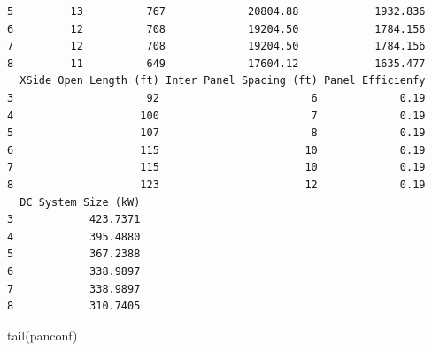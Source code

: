 \documentclass[
  letterpaper,
  DIV=11,
  numbers=noendperiod]{scrartcl}
\newenvironment{Shaded}{\begin{snugshade}}{\end{snugshade}}
\newcommand{\FunctionTok}[1]{\textcolor[rgb]{0.28,0.35,0.67}{#1}}
\newcommand{\NormalTok}[1]{\textcolor[rgb]{0.00,0.23,0.31}{#1}}
\begin{document}
\begin{verbatim}
5         13          767             20804.88            1932.836
6         12          708             19204.50            1784.156
7         12          708             19204.50            1784.156
8         11          649             17604.12            1635.477
  XSide Open Length (ft) Inter Panel Spacing (ft) Panel Efficienfy
3                     92                        6             0.19
4                    100                        7             0.19
5                    107                        8             0.19
6                    115                       10             0.19
7                    115                       10             0.19
8                    123                       12             0.19
  DC System Size (kW)
3            423.7371
4            395.4880
5            367.2388
6            338.9897
7            338.9897
8            310.7405
\end{verbatim}

\begin{Shaded}
\begin{Highlighting}[]
\FunctionTok{tail}\NormalTok{(panconf)}
\end{Highlighting}
\end{Shaded}
\end{document}
